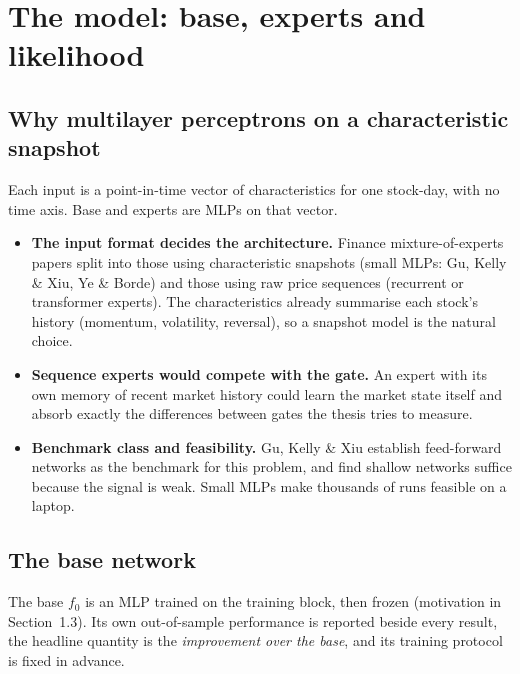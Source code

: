 \section{The model: base, experts and likelihood}
\label{sec:model}

\subsection{Why multilayer perceptrons on a characteristic snapshot}

Each input is a point-in-time vector of characteristics for one stock-day, with no time axis. Base and
experts are MLPs on that vector.

\begin{whybox}
\begin{itemize}
\item \textbf{The input format decides the architecture.} Finance mixture-of-experts papers split into those
  using characteristic snapshots (small MLPs: Gu, Kelly \& Xiu, Ye \& Borde) and those using raw price
  sequences (recurrent or transformer experts). The characteristics already summarise each stock's history
  (momentum, volatility, reversal), so a snapshot model is the natural choice.
\item \textbf{Sequence experts would compete with the gate.} An expert with its own memory of recent market
  history could learn the market state itself and absorb exactly the differences between gates the thesis
  tries to measure.
\item \textbf{Benchmark class and feasibility.} Gu, Kelly \& Xiu establish feed-forward networks as the
  benchmark for this problem, and find shallow networks suffice because the signal is weak. Small MLPs make
  thousands of runs feasible on a laptop.
\end{itemize}
\end{whybox}

\subsection{The base network}

 The base $f_0$ is an MLP trained on the training block, then frozen (motivation in
Section~1.3). Its own out-of-sample performance is reported beside every result, the headline quantity is
the \emph{improvement over the base}, and its training protocol is fixed in advance.

